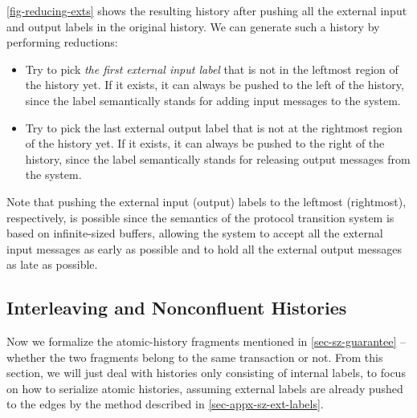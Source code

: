 \documentclass[sigplan,10pt,review,anonymous,screen]{acmart}\settopmatter{printfolios=true,printccs=false,printacmref=false}
\begin{document}
\autoref{fig-reducing-exts} shows the resulting history after pushing all the external input and output labels in the original history.
We can generate such a history by performing reductions:
\begin{itemize}[leftmargin=*]
\item Try to pick \emph{the first external input label} that is not in the leftmost region of the history yet. If it exists, it can always be pushed to the left of the history, since the label semantically stands for adding input messages to the system.
\item Try to pick the last external output label that is not at the rightmost region of the history yet. If it exists, it can always be pushed to the right of the history, since the label semantically stands for releasing output messages from the system.
\end{itemize}
Note that pushing the external input (output) labels to the leftmost (rightmost), respectively, is possible since the semantics of the protocol transition system is based on infinite-sized buffers, allowing the system to accept all the external input messages as early as possible and to hold all the external output messages as late as possible.

\subsection{Interleaving and Nonconfluent Histories}

\newcommand{\hcont}[2]{\ensuremath{#1 \leadsto #2}}
\newcommand{\hextcont}[3]{\ensuremath{#1 \vdash #2 \leadsto_{\textsf{ext}} #3}}
\newcommand{\hdiscont}[2]{\ensuremath{#1 \not\leadsto #2}}
\newcommand{\hitlv}[2]{\ensuremath{\mathsf{Interleaved}\ #1\ #2}}

Now we formalize the atomic-history fragments mentioned in \autoref{sec-sz-guarantee} -- whether the two fragments belong to the same transaction or not.
From this section, we will just deal with histories only consisting of internal labels, to focus on how to serialize atomic histories, assuming external labels are already pushed to the edges by the method described in \autoref{sec-appx-sz-ext-labels}.
\end{document}
